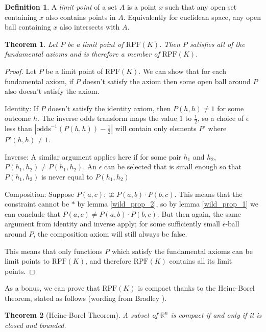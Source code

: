 \documentclass[twoside]{article}
\theoremstyle{plain}%
\newtheorem{theorem}{Theorem}[section]
\theoremstyle{definition}
\newtheorem{definition}{Definition}[section]
\theoremstyle{remark}
\begin{document}
\begin{definition}
A \textit{limit point} of a set \(A\) is a point \(x\) such that any open set containing \(x\) also contains points in \(A\). Equivalently for euclidean space, any open ball containing \(x\) also intersects with \(A\).
\end{definition}

\begin{theorem}
\label{thm:rpf_closed}
Let \(P\) be a \textit{limit point} of \(\text{RPF}(K)\). Then \(P\) satisfies all of the fundamental axioms and is therefore a member of \(\text{RPF}(K)\).
\end{theorem}

\begin{proof}
Let \(P\) be a limit point of \(\text{RPF}(K)\). We can show that for each fundamental axiom, if \(P\) doesn't satisfy the axiom then some open ball around \(P\) also doesn't satisfy the axiom.

Identity: If \(P\) doesn't satisfy the identity axiom, then \(P(h, h) \neq 1\) for some outcome \(h\). The inverse odds transform maps the value \(1\) to \(\frac{1}{2}\), so a choice of \(\epsilon\) less than \(|\text{odds}^{-1}(P(h, h)) - \frac{1}{2}|\) will contain only elements \(P'\) where \(P'(h, h) \neq 1\).

Inverse: A similar argument applies here if for some pair \(h_1\) and \(h_2\), \(P(h_1, h_2) \neq P(h_1, h_2)\). An \(\epsilon\) can be selected that is small enough so that \(P(h_1, h_2)\) is never equal to \(P(h_1, h_2)\)

Composition: Suppose \(P(a, c) :\ncong P(a, b) \cdot P(b, c) \). This means that the constraint cannot be \(\ast\) by lemma \ref{wild_prop_2}, so by lemma \ref{wild_prop_1} we can conclude that \(P(a, c) \neq P(a, b) \cdot P(b, c) \). But then again, the same argument from identity and inverse apply; for some sufficiently small \(\epsilon\)-ball around \(P\), the composition axiom will still always be false.

This means that only functions \(P\) which satisfy the fundamental axioms can be limit points to \(\text{RPF}(K)\), and therefore \(\text{RPF}(K)\) contains all its limit points.
\end{proof}

As a bonus, we can prove that \(\text{RPF}(K)\) is compact thanks to the Heine-Borel theorem, stated as follows (wording from Bradley \cite{bradley}).

\begin{theorem}[Heine-Borel Theorem]
A subset of \(\mathbb{R}^n\) is compact if and only if it is closed and bounded.
\end{theorem}
\end{document}
